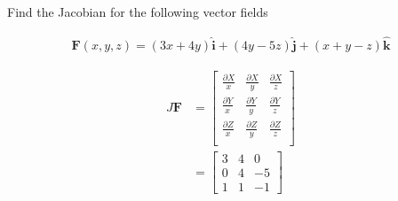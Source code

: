 Find the Jacobian for the following vector fields

\begin{align*}
    \boldsymbol{F}(x, y, z) = (3x + 4y) \boldsymbol{\hat{i}} + (4y - 5z) \boldsymbol{\hat{j}} + (x + y - z) \boldsymbol{\hat{k}}
\end{align*}

\begin{solution}
\begin{align*}
    J\boldsymbol{F} &= \begin{bmatrix}
        \frac{\partial X}{x} & \frac{\partial X}{y} & \frac{\partial X}{z} \\
        \frac{\partial Y}{x} & \frac{\partial Y}{y} & \frac{\partial Y}{z} \\
        \frac{\partial Z}{x} & \frac{\partial Z}{y} & \frac{\partial Z}{z} \\
    \end{bmatrix} \\
    &= \begin{bmatrix}
        3 & 4 & 0 \\
        0 & 4 & -5 \\
        1 & 1 & -1
    \end{bmatrix}
\end{align*}
\end{solution}